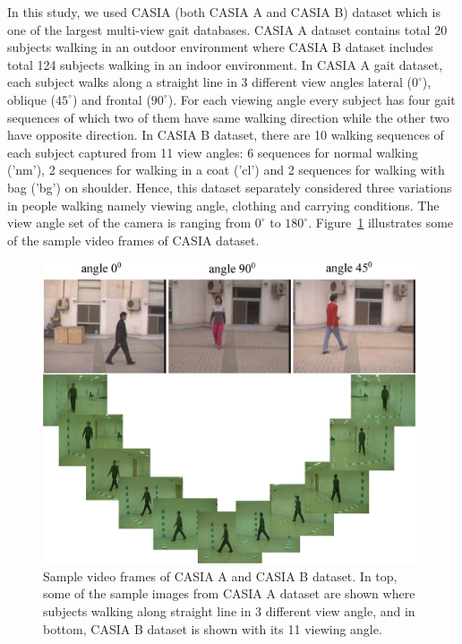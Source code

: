 In this study, we used CASIA (both CASIA A and CASIA B) dataset which is one of the largest multi-view gait databases. CASIA A dataset contains total 20 subjects walking in an outdoor environment where CASIA B dataset includes total 124 subjects walking in an indoor environment. In CASIA A gait dataset, each subject walks along a straight line in 3 different view angles lateral (${0^{\circ}}$), oblique (${45^{\circ}}$) and frontal (${90^{\circ}}$). For each viewing angle every subject has four gait sequences of which two of them have same walking direction while the other two have opposite direction. In CASIA B dataset, there are 10 walking sequences of each subject captured from 11 view angles: 6 sequences for normal walking ('nm'), 2 sequences for walking in a coat ('cl') and 2 sequences for walking with bag ('bg') on shoulder. Hence, this dataset separately considered three variations in people walking namely viewing angle, clothing and carrying conditions. The view angle set of the camera is ranging from ${0^{\circ}}$ to ${180^{\circ}}$. Figure~\ref{fig:casia_dataset} illustrates some of the sample video frames of CASIA dataset.


\begin{figure}
	\centering
	\includegraphics[width = 110mm]{figures/casia_dataset.eps}
	\caption{
		Sample video frames of CASIA A and CASIA B dataset. In top, some of the sample images from CASIA A dataset are shown where subjects walking along straight line in 3 different view angle, and in bottom, CASIA B dataset is shown with its 11 viewing angle.
	}
	\label{fig:casia_dataset}
\end{figure}


